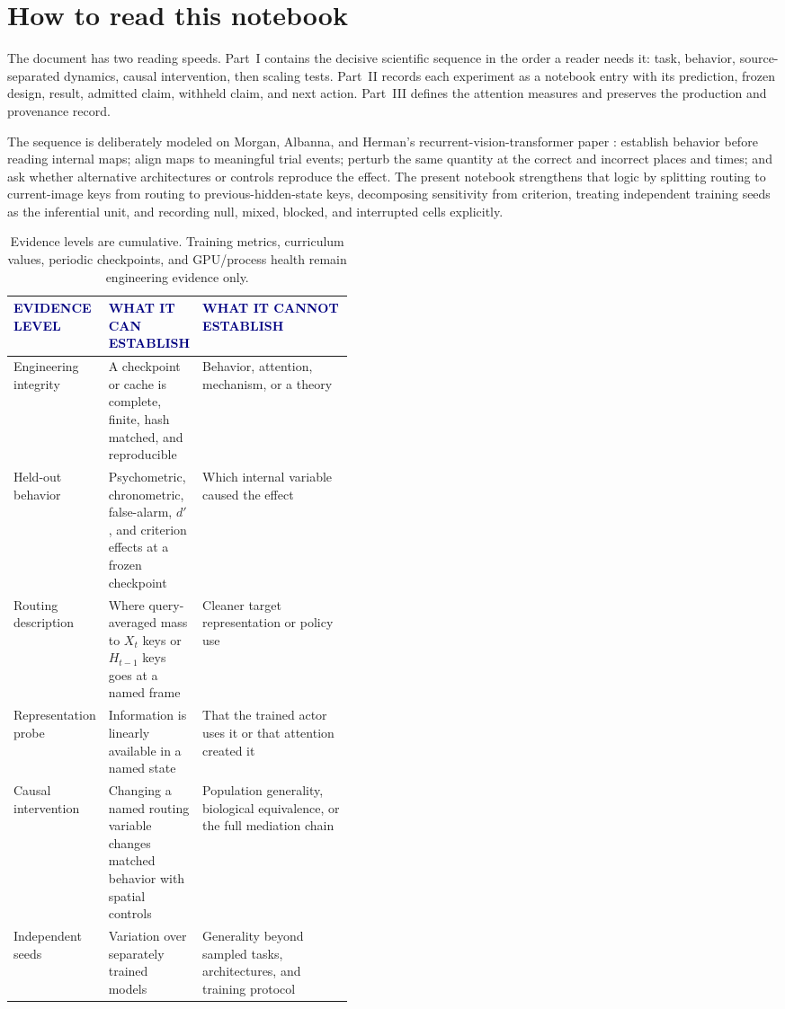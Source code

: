 \documentclass[11pt]{article}
\newcommand{\smallcapslabel}[1]{\textcolor{Navy}{\sffamily\bfseries\footnotesize\MakeUppercase{#1}}}
\begin{document}
\begingroup
\small
\setlength{\parskip}{0pt}
\tableofcontents
\endgroup
\clearpage

\section*{How to read this notebook}
The document has two reading speeds. Part~I contains the decisive scientific sequence in the order a reader needs it: task, behavior, source-separated dynamics, causal intervention, then scaling tests. Part~II records each experiment as a notebook entry with its prediction, frozen design, result, admitted claim, withheld claim, and next action. Part~III defines the attention measures and preserves the production and provenance record.

The sequence is deliberately modeled on Morgan, Albanna, and Herman's recurrent-vision-transformer paper \cite{mah2025}: establish behavior before reading internal maps; align maps to meaningful trial events; perturb the same quantity at the correct and incorrect places and times; and ask whether alternative architectures or controls reproduce the effect. The present notebook strengthens that logic by splitting routing to current-image keys from routing to previous-hidden-state keys, decomposing sensitivity from criterion, treating independent training seeds as the inferential unit, and recording null, mixed, blocked, and interrupted cells explicitly.

\begin{table}[H]
\centering\small
\begin{tabularx}{\linewidth}{@{}L{0.19\linewidth}L{0.25\linewidth}Y@{}}
\toprule
\smallcapslabel{Evidence level} & \smallcapslabel{What it can establish} & \smallcapslabel{What it cannot establish}\\
\midrule
Engineering integrity & A checkpoint or cache is complete, finite, hash matched, and reproducible & Behavior, attention, mechanism, or a theory\\
Held-out behavior & Psychometric, chronometric, false-alarm, $d'$, and criterion effects at a frozen checkpoint & Which internal variable caused the effect\\
Routing description & Where query-averaged mass to $X_t$ keys or $H_{t-1}$ keys goes at a named frame & Cleaner target representation or policy use\\
Representation probe & Information is linearly available in a named state & That the trained actor uses it or that attention created it\\
Causal intervention & Changing a named routing variable changes matched behavior with spatial controls & Population generality, biological equivalence, or the full mediation chain\\
Independent seeds & Variation over separately trained models & Generality beyond sampled tasks, architectures, and training protocol\\
\bottomrule
\end{tabularx}
\caption{Evidence levels are cumulative. Training metrics, curriculum values, periodic checkpoints, and GPU/process health remain engineering evidence only.}
\end{table}
\end{document}
